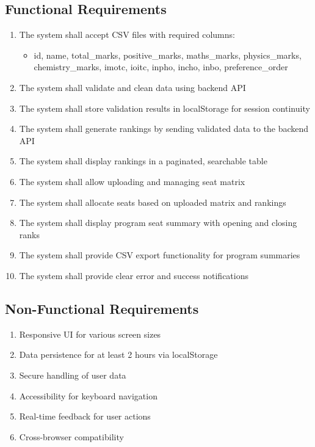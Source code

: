 \documentclass[12pt,a4paper]{article}
\begin{document}
\subsection{Functional Requirements}
\begin{enumerate}[label=FR\arabic*.]
    \item The system shall accept CSV files with required columns:
    \begin{itemize}
        \item id, name, total\_marks, positive\_marks, maths\_marks, physics\_marks, chemistry\_marks, imotc, ioitc, inpho, incho, inbo, preference\_order
    \end{itemize}
    \item The system shall validate and clean data using backend API
    \item The system shall store validation results in localStorage for session continuity
    \item The system shall generate rankings by sending validated data to the backend API
    \item The system shall display rankings in a paginated, searchable table
    \item The system shall allow uploading and managing seat matrix
    \item The system shall allocate seats based on uploaded matrix and rankings
    \item The system shall display program seat summary with opening and closing ranks
    \item The system shall provide CSV export functionality for program summaries
    \item The system shall provide clear error and success notifications
\end{enumerate}

\subsection{Non-Functional Requirements}
\begin{enumerate}[label=NFR\arabic*.]
    \item Responsive UI for various screen sizes
    \item Data persistence for at least 2 hours via localStorage
    \item Secure handling of user data
    \item Accessibility for keyboard navigation
    \item Real-time feedback for user actions
    \item Cross-browser compatibility
\end{enumerate}
\end{document}
